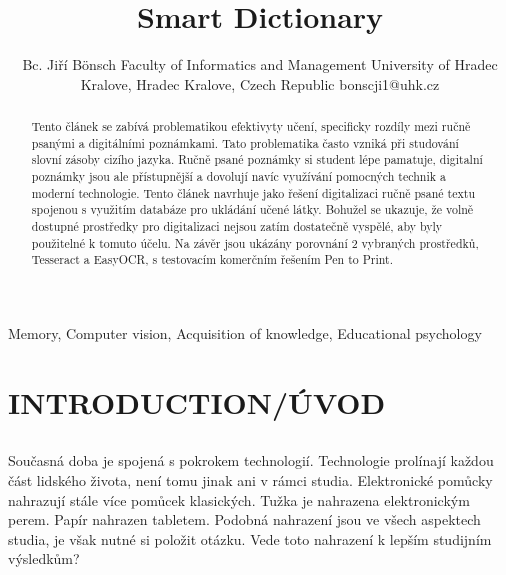 \documentclass[journal]{IEEEtran}
\title{Smart Dictionary}
\author{Bc. Jiří Bönsch
        \linebreak
        Faculty of Informatics and Management
        \linebreak
        University of Hradec Kralove,
        \linebreak
        Hradec Kralove, Czech Republic
        \linebreak
        bonscji1@uhk.cz

}
\begin{document}
\maketitle

\begin{abstract}
        Tento článek se zabívá problematikou efektivyty učení, specificky rozdíly mezi ručně psanými a digitálními poznámkami.
        Tato problematika často vzniká při studování slovní zásoby cizího jazyka. Ručně psané poznámky si student lépe pamatuje, digitalní poznámky jsou ale přístupnější a dovolují navíc využívání pomocných technik a moderní technologie. Tento článek navrhuje jako řešení digitalizaci ručně psané textu spojenou s využitím databáze pro ukládání učené látky.
        Bohužel se ukazuje, že volně dostupné prostředky pro digitalizaci nejsou zatím dostatečně vyspělé, aby byly použitelné k tomuto účelu.
        Na závěr jsou ukázány porovnání 2 vybraných prostředků, Tesseract a EasyOCR, s testovacím komerčním řešením Pen to Print.
\end{abstract}

\begin{IEEEkeywords}
Memory, Computer vision, Acquisition of knowledge, Educational psychology
\end{IEEEkeywords}


\IEEEpeerreviewmaketitle



\section{INTRODUCTION/ÚVOD}

\subsection{}
Současná doba je spojená s pokrokem technologií.
Technologie prolínají každou část lidského života, není tomu jinak ani v rámci studia.
Elektronické pomůcky nahrazují stále více pomůcek klasických.
Tužka je nahrazena elektronickým perem. Papír nahrazen tabletem.
Podobná nahrazení jsou ve všech aspektech studia, je však nutné si položit otázku.
Vede toto nahrazení  k lepším studijním výsledkům?
\end{document}
